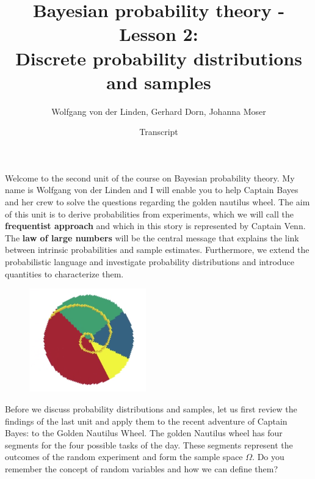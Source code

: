 \documentclass[12pt, a4paper]{scrartcl}
\title{Bayesian probability theory - Lesson 2:\\
Discrete probability distributions and samples}
\author{Wolfgang von der Linden, Gerhard Dorn, Johanna Moser}
\date{Transcript}
\begin{document}
\setlength{\parindent}{0pt}
\maketitle
\onehalfspacing

Welcome to the second unit of the course on Bayesian probability theory. My name is Wolfgang von der Linden and I will enable you to help Captain Bayes and her crew to solve the questions regarding the golden nautilus wheel.
The aim of this unit is to derive probabilities from experiments, which we will call the \textbf{frequentist approach} and which in this story is represented by Captain Venn. 
The \textbf{law of large numbers} will be the central message that explains the link between intrinsic probabilities and sample estimates.
Furthermore, we extend the probabilistic language and investigate probability distributions and introduce quantities to characterize them.\\
\begin{figure}[H]
	\centering
	\includegraphics[width=0.45\textwidth]{2_1.png}
\end{figure}
Before we discuss probability distributions and samples, let us first review the findings of the last unit and apply them to the recent adventure of Captain Bayes: to the Golden Nautilus Wheel.
The golden Nautilus wheel has four segments for the four possible tasks of the day. These segments represent the outcomes of the random experiment and form the sample space $\Omega$.
Do you remember the concept of random variables and how we can define them? \\

\\
\end{document}
